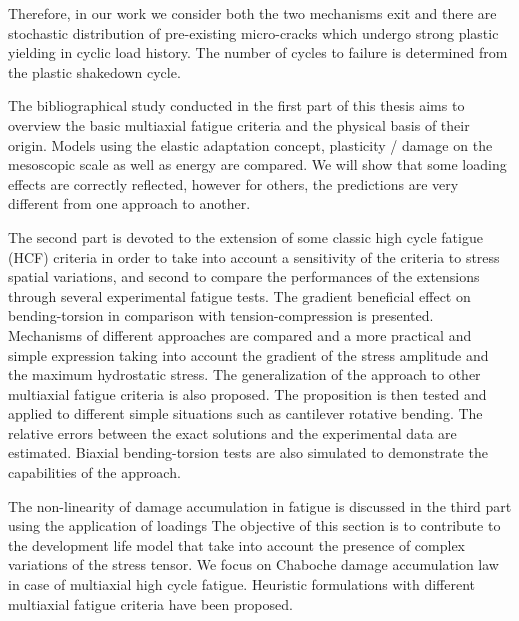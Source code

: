 \documentclass[3p,times,procedia,number]{elsarticle}
\begin{document}
Therefore, in our work we consider both the two mechanisms exit and there are stochastic distribution of pre-existing micro-cracks which undergo strong plastic yielding in cyclic load history. The number of cycles to failure is determined from the plastic shakedown cycle.

The bibliographical study conducted in the first part of this thesis aims to
overview the basic multiaxial fatigue criteria and the physical basis of their origin. Models using the elastic adaptation concept, plasticity / damage on the mesoscopic scale as well as energy
are compared. We will show that some loading effects are correctly reflected, however for others, the predictions are very different from one approach to another.

The second part is devoted to the extension of some classic high cycle fatigue (HCF) criteria in order  to take into account a sensitivity of the criteria to stress spatial variations, and second to compare the performances of the extensions through several experimental fatigue tests. The gradient beneficial effect on bending-torsion in comparison with tension-compression is presented. Mechanisms of different approaches are compared and a more practical and simple expression taking into account the gradient of the stress amplitude and the maximum hydrostatic stress. The generalization of the approach to other multiaxial fatigue criteria is also proposed.  The proposition is then tested and applied to different simple situations such as cantilever rotative bending. The relative errors between the exact solutions and the experimental data are estimated. Biaxial  bending-torsion tests are also simulated to demonstrate the capabilities of the approach. 

The non-linearity of damage accumulation in fatigue is discussed in the third part using the application of loadings
The objective of this section is to contribute to the development life model that take into account the presence of complex variations of the stress tensor. We focus on Chaboche damage accumulation law in case of multiaxial high cycle fatigue. Heuristic formulations with different multiaxial fatigue criteria have been proposed.
\end{document}
